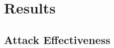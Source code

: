 \documentclass[11pt]{article}
\begin{document}

\section{Results}




\subsection{Attack Effectiveness}
\end{document}
